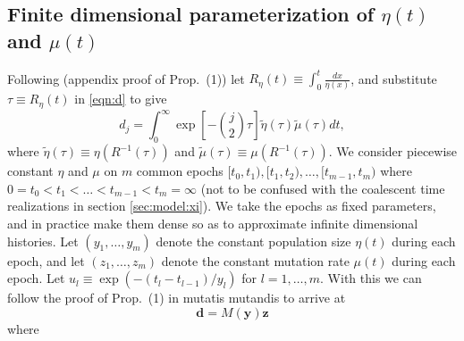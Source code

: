 \documentclass[11pt]{article}
\begin{document}
\subsection{Finite dimensional parameterization of $\eta(t)$ and $\mu(t)$}\label{sec:model:pcsws}

Following \cite{Rosen2018-bb} (appendix proof of Prop.\ (1)) let $R_\eta(t) \equiv \int_0^t\frac{dx}{\eta(x)}$, and substitute $\tau \equiv R_\eta(t)$ in \ref{eqn:d} to give
\begin{equation}
\label{eqn:d2}
d_j = \int_0^\infty \exp\left[-\binom{j}{2}\tau\right] \tilde\eta(\tau)\tilde\mu(\tau)dt,
\end{equation}
where $\tilde\eta(\tau) \equiv \eta(R^{-1}(\tau))$ and $\tilde\mu(\tau) \equiv \mu(R^{-1}(\tau))$.
We consider piecewise constant $\eta$ and $\mu$ on $m$ common epochs $[t_0, t_1), [t_1, t_2),\dots, [t_{m-1}, t_m)$ where $0=t_0 < t_1 < \dots < t_{m-1} < t_m=\infty$ (not to be confused with the coalescent time realizations in section \ref{sec:model:xi}).
We take the epochs as fixed parameters, and in practice make them dense so as to approximate infinite dimensional histories.
Let $(y_1,\dots,y_m)$ denote the constant population size $\eta(t)$ during each epoch, and let $(z_1,\dots,z_m)$ denote the constant mutation rate $\mu(t)$ during each epoch.
Let $u_l \equiv \exp(-(t_l-t_{l-1})/y_l)$ for $l=1,\dots,m$.%
With this we can follow the proof of Prop.\ (1) in \cite{Rosen2018-bb} mutatis mutandis to arrive at
\begin{equation}
\label{eqn:d3}
\boldsymbol d = M(\boldsymbol y) \boldsymbol z
\end{equation}
where
\end{document}
